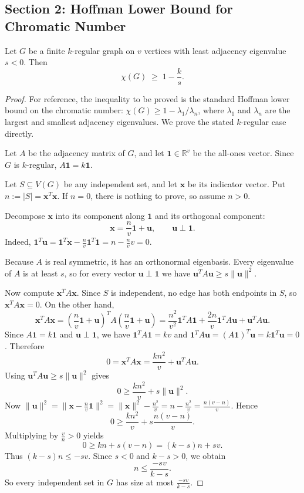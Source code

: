 \subsection*{Section 2: Hoffman Lower Bound for Chromatic Number}

\begin{theorem}
\label{thm:hoffman}
Let $G$ be a finite $k$-regular graph on $v$ vertices with least adjacency eigenvalue $s<0$. Then
\[
  \chi(G) \;\ge\; 1-\frac{k}{s}.
\]
\end{theorem}

\begin{proof}
For reference, the inequality to be proved is the standard Hoffman lower bound on the chromatic number: $\chi(G)\ge 1-\lambda_{1}/\lambda_{n}$, where $\lambda_{1}$ and $\lambda_{n}$ are the largest and smallest adjacency eigenvalues. We prove the stated $k$-regular case directly.

Let $A$ be the adjacency matrix of $G$, and let $\mathbf{1}\in\mathbb{R}^{v}$ be the all-ones vector. Since $G$ is $k$-regular, $A\mathbf{1}=k\mathbf{1}$.

Let $S\subseteq V(G)$ be any independent set, and let $\mathbf{x}$ be its indicator vector. Put $n:=|S|=\mathbf{x}^{T}\mathbf{x}$. If $n=0$, there is nothing to prove, so assume $n>0$.

Decompose $\mathbf{x}$ into its component along $\mathbf{1}$ and its orthogonal component:
\[
\mathbf{x}=\frac{n}{v}\mathbf{1}+\mathbf{u},\qquad \mathbf{u}\perp \mathbf{1}.
\]
Indeed, $\mathbf{1}^{T}\mathbf{u}=\mathbf{1}^{T}\mathbf{x}-\frac{n}{v}\mathbf{1}^{T}\mathbf{1}=n-\frac{n}{v}v=0$.

Because $A$ is real symmetric, it has an orthonormal eigenbasis. Every eigenvalue of $A$ is at least $s$, so for every vector $\mathbf{u}\perp \mathbf{1}$ we have $\mathbf{u}^{T}A\mathbf{u}\ge s\|\mathbf{u}\|^{2}$.

Now compute $\mathbf{x}^{T}A\mathbf{x}$. Since $S$ is independent, no edge has both endpoints in $S$, so $\mathbf{x}^{T}A\mathbf{x}=0$. On the other hand,
\[
\mathbf{x}^{T}A\mathbf{x}
=\left(\frac{n}{v}\mathbf{1}+\mathbf{u}\right)^{T}A\left(\frac{n}{v}\mathbf{1}+\mathbf{u}\right)
=\frac{n^{2}}{v^{2}}\mathbf{1}^{T}A\mathbf{1}+\frac{2n}{v}\mathbf{1}^{T}A\mathbf{u}+\mathbf{u}^{T}A\mathbf{u}.
\]
Since $A\mathbf{1}=k\mathbf{1}$ and $\mathbf{u}\perp\mathbf{1}$, we have $\mathbf{1}^{T}A\mathbf{1}=kv$ and $\mathbf{1}^{T}A\mathbf{u}=(A\mathbf{1})^{T}\mathbf{u}=k\mathbf{1}^{T}\mathbf{u}=0$.
Therefore
\[
0=\mathbf{x}^{T}A\mathbf{x}=\frac{kn^{2}}{v}+\mathbf{u}^{T}A\mathbf{u}.
\]
Using $\mathbf{u}^{T}A\mathbf{u}\ge s\|\mathbf{u}\|^{2}$ gives
\[
0\ge\frac{kn^{2}}{v}+s\|\mathbf{u}\|^{2}.
\]
Now $\|\mathbf{u}\|^{2}=\|\mathbf{x}-\frac{n}{v}\mathbf{1}\|^{2}=\|\mathbf{x}\|^{2}-\frac{n^{2}}{v}=n-\frac{n^{2}}{v}=\frac{n(v-n)}{v}$.
Hence
\[
0\ge\frac{kn^{2}}{v}+s\frac{n(v-n)}{v}.
\]
Multiplying by $\frac{v}{n}>0$ yields
\[
0\ge kn+s(v-n)=(k-s)n+sv.
\]
Thus $(k-s)n\le -sv$. Since $s<0$ and $k-s>0$, we obtain
\[
n\le \frac{-sv}{k-s}.
\]
So every independent set in $G$ has size at most $\frac{-sv}{k-s}$.


\end{proof}
